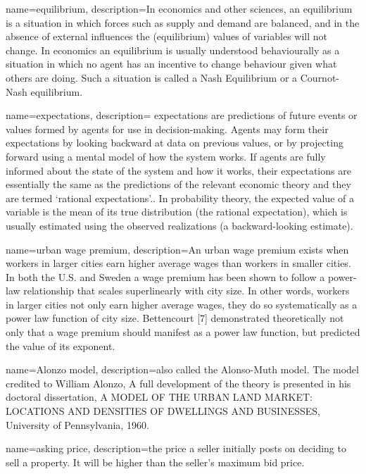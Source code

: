 {
name=equilibrium,
description={In economics and other sciences, an equilibrium is a situation in which forces such as supply and demand are balanced, and in the absence of external influences the (equilibrium) values of variables will not change. In economics an equilibrium is usually understood behaviourally as a situation in which no agent has an incentive to change behaviour given what others are doing. Such a situation is called a Nash Equilibrium or a Cournot-Nash equilibrium.}
}

{
name=expectations,
description={ expectations are predictions of future events or values formed by agents for use in decision-making. Agents may form their expectations by looking backward at data on previous values, or by projecting forward using a mental model of how the system works. If agents are fully informed about the state of the system and how it works, their expectations are essentially the same as the predictions of the relevant economic theory and they are termed `rational expectations'.\cite{muthRationalExpectationsTheory1961}. In probability theory, the expected value of a variable is the mean of its true distribution (the rational expectation), which is usually estimated using the observed realizations (a backward-looking estimate).}
}

{
name=urban wage premium,
description={An urban wage premium exists when workers in larger cities earn higher average wages than workers in smaller cities. In both the U.S.  and Sweden a wage premium has been shown to follow a power-law relationship that scales superlinearly with city size. In other words, workers in larger cities not only earn higher average wages, they do so systematically as a power law function of city size. Bettencourt [7] demonstrated theoretically not only that a wage premium should manifest as a power law function, but predicted the value of its exponent. }
}

{
name=Alonzo model,
description={also called the Alonso-Muth model. The model credited to William Alonzo, A full development of the theory is presented in his doctoral dissertation, A MODEL OF THE URBAN LAND MARKET: LOCATIONS AND DENSITIES OF DWELLINGS AND BUSINESSES, University of Pennsylvania, 1960. }
}

{
name=asking price,
description={the price a seller initially posts on deciding to sell a property. It will be higher than the seller's maximum bid price.}
}

